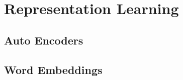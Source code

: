 \section{Representation Learning}
\label{representation_learning}
\subsection{Auto Encoders}
\subsection{Word Embeddings}